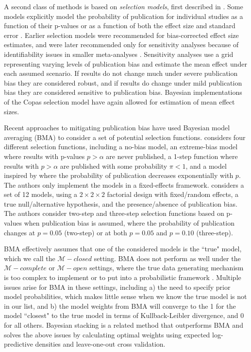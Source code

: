 \documentclass[12pt]{article}   	%
\numberwithin{equation}{section}
\begin{document}
A second class of methods is based on \textit{selection models}, first described in \citet{hedges1984selection}. Some models explicitly model the probability of publication for individual studies as a function of their p-values \citep{hedges1992selection, givens1997, vevea1995pubbias} or as a function of both the effect size and standard error \citep{copas1999what, copas2000funnel, copas2001sensitivity}. Earlier selection models were recommended for bias-corrected effect size estimates, and were later recommended only for sensitivity analyses because of identifiability issues in smaller meta-analyses \citep{vevea2005sensitivity, jin2015methods}. Sensitivity analyses use a grid representing varying levels of publication bias and estimate the mean effect under each assumed scenario. If results do not change much under severe publication bias they are considered robust, and if results do change under mild publication bias they are considered sensitive to publication bias. Bayesian implementations of the Copas selection model \citep{mavridis2013copas, bai2020} have again allowed for estimation of mean effect sizes.

Recent approaches to mitigating publication bias have used Bayesian model averaging (BMA) to consider a set of potential selection functions. \citet{guan2016} considers four different selection functions, including a no-bias model, an extreme-bias model where results with p-values $p > \alpha$ are never published, a 1-step function where results with $p > \alpha$ are published with some probability $\pi < 1$, and a model inspired by \citet{givens1997} where the probability of publication decreases exponentially with $p$. The authors only implement the models in a fixed-effects framework. \citet{maier2020robma} considers a set of 12 models, using a $2 \times 2 \times 2$ factorial design with fixed/random effects, a true null/alternative hypothesis, and the presence/absence of publication bias. The authors consider two-step and three-step selection functions based on p-values when publication bias is assumed, where the probability of publication changes at $p=0.05$ (two-step) or at both $p = 0.05$ and $p = 0.10$ (three-step).  

BMA effectively assumes that one of the considered models is the ``true" model, which we call the $\mathcal{M}-closed$ setting. BMA does not perform as well under the $\mathcal{M}-complete$ or $\mathcal{M}-open$ settings, where the true data generating mechanism is too complex to implement or to put into a probabilistic framework \citep{clyde2013bma}. Multiple issues arise for BMA in these settings, including a) the need to specify prior model probabilities, which makes little sense when we know the true model is not in our list, and b) the model weights from BMA will converge to the  1 for the model ``closest" to the true model in terms of Kullback-Leibler divergence, and 0 for all others. Bayesian stacking \citep{yao2018stacking, yao2021hierarchical} is a related method that outperforms BMA and solves the above issues by calculating optimal weights using expected log-predictive densities and leave-one-out cross validation. 
\end{document}
